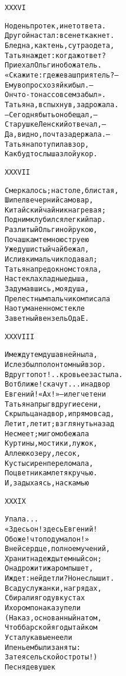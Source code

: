 \begin{minipage}[t]{\dimexpr 0.5\textwidth -\tabcolsep-.5pt}
\begin{alltt}\normalfont\centering
XXXVI

Но день протек, и нет ответа.
Другой настал: все нет как нет.
Бледна, как тень, с утра одета,
Татьяна ждет: когда ж ответ?
Приехал Ольгин обожатель.
«Скажите: где же ваш приятель? —
Ему вопрос хозяйки был. —
Он что-то нас совсем забыл».
Татьяна, вспыхнув, задрожала.
— Сегодня быть он обещал, —
Старушке Ленский отвечал, —
Да, видно, почта задержала. —
Татьяна потупила взор,
Как будто слыша злой укор.
\end{alltt}
\end{minipage}

\begin{minipage}[t]{\dimexpr 0.5\textwidth -\tabcolsep-.5pt}
\begin{alltt}\normalfont\centering
XXXVII

Смеркалось; на столе, блистая,
Шипел вечерний самовар,
Китайский чайник нагревая;
Под ним клубился легкий пар.
Разлитый Ольгиной рукою,
По чашкам темною струею
Уже душистый чай бежал,
И сливки мальчик подавал;
Татьяна пред окном стояла,
На стекла хладные дыша,
Задумавшись, моя душа,
Прелестным пальчиком писала
На отуманенном стекле
Заветный вензель О да Е.
\end{alltt}
\end{minipage}
\clearpage

\begin{minipage}[t]{\dimexpr 0.5\textwidth -\tabcolsep-.5pt}
\begin{alltt}\normalfont\centering
XXXVIII

И между тем душа в ней ныла,
И слез был полон томный взор.
Вдруг топот!.. кровь ее застыла.
Вот ближе! скачут... и на двор
Евгений! «Ах!» — и легче тени
Татьяна прыг в другие сени,
С крыльца на двор, и прямо в сад,
Летит, летит; взглянуть назад
Не смеет; мигом обежала
Куртины, мостики, лужок,
Аллею к озеру, лесок,
Кусты сирен переломала,
По цветникам летя к ручью.
И, задыхаясь, на скамью
\end{alltt}
\end{minipage}

\begin{minipage}[t]{\dimexpr 0.5\textwidth -\tabcolsep-.5pt}
\begin{alltt}\normalfont\centering
XXXIX

Упала...
         «Здесь он! здесь Евгений!
О боже! что подумал он!»
В ней сердце, полное мучений,
Хранит надежды темный сон;
Она дрожит и жаром пышет,
И ждет: нейдет ли? Но не слышит.
В саду служанки, на грядах,
Сбирали ягоду в кустах
И хором по наказу пели
(Наказ, основанный на том,
Чтоб барской ягоды тайком
Уста лукавые не ели
И пеньем были заняты:
Затея сельской остроты!)
Песня девушек
\end{alltt}
\end{minipage}

